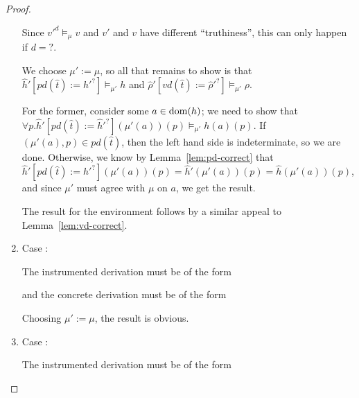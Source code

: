 \documentclass{article}
\begin{document}
\begin{proof}
\begin{enumerate}
  Since $v'^d\models_{\mu}v$ and $v'$ and $v$ have different ``truthiness'', this can only happen if $d=?$.

  We choose $\mu':=\mu$, so all that remains to show is that $\hat{h}'[\mathit{pd}(\hat{t}):=\hat{h}'^?]\models_{\mu'}h$ and $\hat{\rho}'[\mathit{vd}(\hat{t}):=\hat{\rho}'^?]\models_{\mu'}\rho$.

  For the former, consider some $a\in\dom(h)$; we need to show that $\forall p.\hat{h}'[\mathit{pd}(\hat{t}):=\hat{h}'^?](\mu'(a))(p)\models_{\mu'}h(a)(p)$. If $(\mu'(a),p)\in\mathit{pd}(\hat{t})$, then the left hand side is indeterminate, so we are done. Otherwise, we know by Lemma~\ref{lem:pd-correct} that $\hat{h}'[\mathit{pd}(\hat{t}):=\hat{h}'^?](\mu'(a))(p)=\hat{h}'(\mu'(a))(p)=\hat{h}(\mu'(a))(p)$, and since $\mu'$ must agree with $\mu$ on $a$, we get the result.
  
  The result for the environment follows by a similar appeal to Lemma~\ref{lem:vd-correct}.

\item Case :

  The instrumented derivation must be of the form

  \begin{prooftree}
  \end{prooftree}

  and the concrete derivation must be of the form

  \begin{prooftree}
  \end{prooftree}

  Choosing $\mu':=\mu$, the result is obvious.
  
\item Case :

  The instrumented derivation must be of the form

  \begin{prooftree}
     
  \end{prooftree}


\end{enumerate}
\end{proof}
\end{document}
